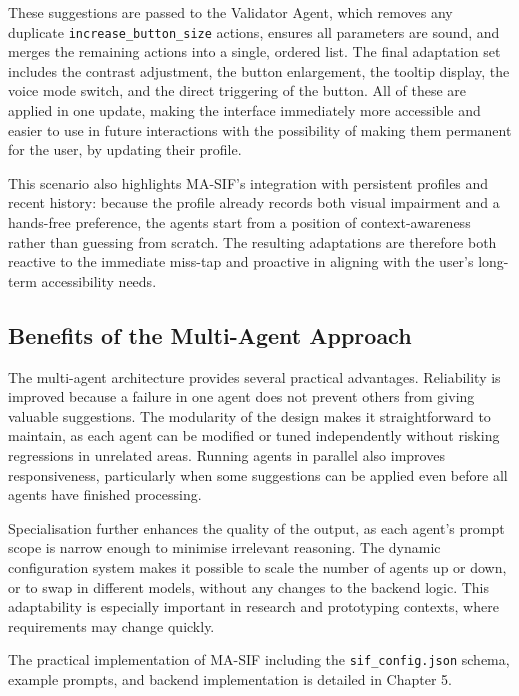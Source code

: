 \documentclass[openany]{book}
\begin{document}
These suggestions are passed to the Validator Agent, which removes any duplicate \texttt{increase\_button\_size} actions, ensures all parameters are sound, and merges the remaining actions into a single, ordered list. The final adaptation set includes the contrast adjustment, the button enlargement, the tooltip display, the voice mode switch, and the direct triggering of the button. All of these are applied in one update, making the interface immediately more accessible and easier to use in future interactions with the possibility of making them permanent for the user, by updating their profile.

This scenario also highlights MA-SIF’s integration with persistent profiles and recent history: because the profile already records both visual impairment and a hands-free preference, the agents start from a position of context-awareness rather than guessing from scratch. The resulting adaptations are therefore both reactive to the immediate miss-tap and proactive in aligning with the user’s long-term accessibility needs.

\subsection{Benefits of the Multi-Agent Approach}
The multi-agent architecture provides several practical advantages. Reliability is improved because a failure in one agent does not prevent others from giving valuable suggestions. The modularity of the design makes it straightforward to maintain, as each agent can be modified or tuned independently without risking regressions in unrelated areas. Running agents in parallel also improves responsiveness, particularly when some suggestions can be applied even before all agents have finished processing.

Specialisation further enhances the quality of the output, as each agent’s prompt scope is narrow enough to minimise irrelevant reasoning. The dynamic configuration system makes it possible to scale the number of agents up or down, or to swap in different models, without any changes to the backend logic. This adaptability is especially important in research and prototyping contexts, where requirements may change quickly.

The practical implementation of MA-SIF including the \texttt{sif\_config.json} schema, example prompts, and backend implementation is detailed in Chapter 5.
\end{document}
